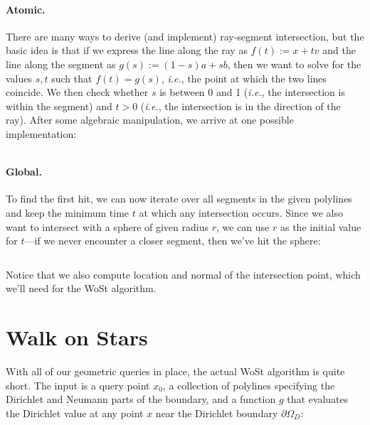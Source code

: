 \documentclass{article}
\newcommand{\ie}{\emph{i.e.}} %
\renewcommand{\vec}[1]{#1}
\begin{document}
\paragraph{Atomic.} There are many ways to derive (and implement) ray-segment intersection, but the basic idea is that if we express the line along the ray as \(\vec{f}(t) := \vec{x} + t\vec{v}\) and the line along the segment as \(\vec{g}(s) := (1-s)\vec{a} + s\vec{b}\), then we want to solve for the values \(s,t\) such that \(\vec{f}(t) = \vec{g}(s)\), \ie, the point at which the two lines coincide.  We then check whether \(s\) is between 0 and 1 (\ie, the intersection is within the segment) and \(t > 0\) (\ie, the intersection is in the direction of the ray).  After some algebraic manipulation, we arrive at one possible implementation:

\inputminted[fontsize=\small,linenos,firstline=48,lastline=60,bgcolor=bg]{cpp}{../code/WoStLaplace2D.cpp}

\paragraph{Global.} To find the first hit, we can now iterate over all segments in the given polylines and keep the minimum time \(t\) at which any intersection occurs.  Since we also want to intersect with a sphere of given radius \(r\), we can use \(r\) as the initial value for \(t\)---if we never encounter a closer segment, then we've hit the sphere:

\inputminted[fontsize=\small,linenos,firstline=90,lastline=109,bgcolor=bg]{cpp}{../code/WoStLaplace2D.cpp}

Notice that we also compute location and normal of the intersection point, which we'll need for the WoSt algorithm.

\section{Walk on Stars}
\label{sec:WalkOnStars}

With all of our geometric queries in place, the actual WoSt algorithm is quite short.  The input is a query point \(\vec{x}_0\), a collection of polylines specifying the Dirichlet and Neumann parts of the boundary, and a function \(g\) that evaluates the Dirichlet value at any point \(x\) near the Dirichlet boundary \(\partial\Omega_D\):

\inputminted[fontsize=\small,linenos,firstline=118,lastline=127,bgcolor=bg]{cpp}{../code/WoStLaplace2D.cpp}
\end{document}
